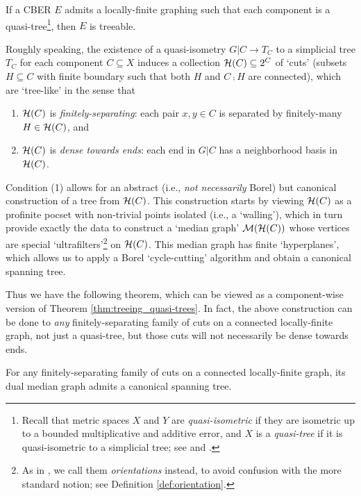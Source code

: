 \documentclass[reqno]{amsart}
\begin{document}
    \begin{mainTheorem}\label{thm:treeing_quasi-trees}
        If a CBER $E$ admits a locally-finite graphing such that each component is a quasi-tree\footnote{Recall that metric spaces $X$ and $Y$ are \textit{quasi-isometric} if they are isometric up to a bounded multiplicative and additive error, and $X$ is a \textit{quasi-tree} if it is quasi-isometric to a simplicial tree; see \cite{Gro93} and \cite{DK18}.}, then $E$ is treeable.
    \end{mainTheorem}

    Roughly speaking, the existence of a quasi-isometry $G|C\to T_C$ to a simplicial tree $T_C$ for each component $C\subseteq X$ induces a collection $\mathcal{H}(C)\subseteq2^C$ of `cuts' (subsets $H\subseteq C$ with finite boundary such that both $H$ and $C\comp H$ are connected), which are `tree-like' in the sense that
    \begin{enumerate}
        \item[1.] $\mathcal{H}(C)$ is \textit{finitely-separating}: each pair $x,y\in C$ is separated by finitely-many $H\in\mathcal{H}(C)$, and
        \item[2.] $\mathcal{H}(C)$ is \textit{dense towards ends}: each end in $G|C$ has a neighborhood basis in $\mathcal{H}(C)$.
    \end{enumerate}
    Condition (1) allows for an abstract (i.e., \textit{not necessarily} Borel) but {\color{red}canonical} construction of a tree from $\mathcal{H}(C)$. This construction starts by viewing $\mathcal{H}(C)$ as a profinite pocset with non-trivial points isolated (i.e., a `walling'), which in turn provide exactly the data to construct a `median graph' $\mathcal{M}(\mathcal{H}(C))$ whose vertices are special `ultrafilters'\footnote{As in \cite{CPTT23}, we call them \textit{orientations} instead, to avoid confusion with the more standard notion; see Definition \ref{def:orientation}.} on $\mathcal{H}(C)$. This median graph has finite `hyperplanes', which allows us to apply a Borel `cycle-cutting' algorithm and obtain a {\color{red}canonical} spanning tree.

    Thus we have the following theorem, which can be viewed as a component-wise version of Theorem \ref{thm:treeing_quasi-trees}. In fact, the above construction can be done to \textit{any} finitely-separating family of cuts on a connected locally-finite graph, not just a quasi-tree, but those cuts will not necessarily be dense towards ends.

    \begin{mainTheorem}\label{thm:component-wise_construction}
        For any finitely-separating family of cuts on a connected locally-finite graph, its dual median graph admits a {\color{red}canonical} spanning tree.
    \end{mainTheorem}
\end{document}
